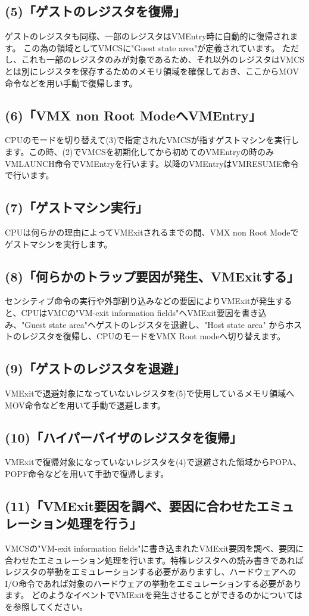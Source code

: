 \documentclass[a4j,12pt]{jarticle}
\begin{document}
\subsection*{(5)「ゲストのレジスタを復帰」}
ゲストのレジスタも同様、一部のレジスタはVMEntry時に自動的に復帰されます。
この為の領域としてVMCSに"Guest state area"が定義されています。
ただし、これも一部のレジスタのみが対象であるため、それ以外のレジスタはVMCSとは別にレジスタを保存するためのメモリ領域を確保しておき、ここからMOV命令などを用い手動で復帰します。

\subsection*{(6)「VMX non Root ModeへVMEntry」}
CPUのモードを切り替えて(3)で指定されたVMCSが指すゲストマシンを実行します。この時、(2)でVMCSを初期化してから初めてのVMEntryの時のみVMLAUNCH命令でVMEntryを行います。以降のVMEntryはVMRESUME命令で行います。

\subsection*{(7)「ゲストマシン実行」}
CPUは何らかの理由によってVMExitされるまでの間、VMX non Root Modeでゲストマシンを実行します。

\subsection*{(8)「何らかのトラップ要因が発生、VMExitする」}
センシティブ命令の実行や外部割り込みなどの要因によりVMExitが発生すると、CPUはVMCの"VM-exit information fields"へVMExit要因を書き込み、"Guest state area"へゲストのレジスタを退避し、"Host state area" からホストのレジスタを復帰し、CPUのモードをVMX Root modeへ切り替えます。

\subsection*{(9)「ゲストのレジスタを退避」}
VMExitで退避対象になっていないレジスタを(5)で使用しているメモリ領域へMOV命令などを用いて手動で退避します。

\subsection*{(10)「ハイパーバイザのレジスタを復帰」}
VMExitで復帰対象になっていないレジスタを(4)で退避された領域からPOPA、POPF命令などを用いて手動で復帰します。

\subsection*{(11)「VMExit要因を調べ、要因に合わせたエミュレーション処理を行う」}
VMCSの"VM-exit information fields"に書き込まれたVMExit要因を調べ、要因に合わせたエミュレーション処理を行います。特権レジスタへの読み書きであればレジスタの挙動をエミュレーションする必要がありますし、ハードウェアへのI/O命令であれば対象のハードウェアの挙動をエミュレーションする必要があります。
どのようなイベントでVMExitを発生させることができるのかについては\cite{SDM}を参照してください。
\end{document}
